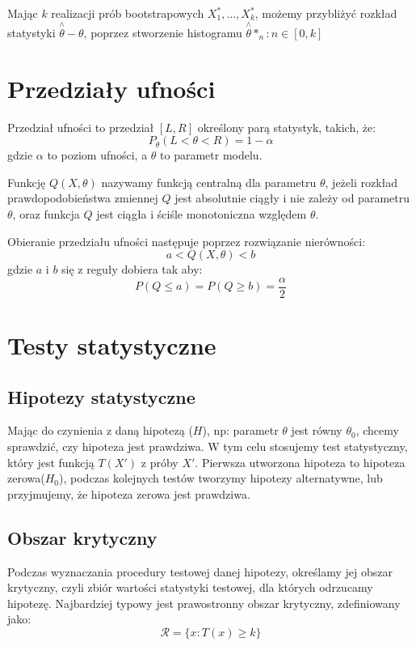 \documentclass{../notatki}
\begin{document}
Mając $k$ realizacji prób bootstrapowych $X_1^*, \dots, X_k^*$, możemy
przybliżyć rozkład statystyki $\stackrel{\wedge}{\theta} - \theta$, poprzez
stworzenie histogramu $\stackrel{\wedge}{\theta}*_n: n\in [0,k]$

\section{Przedziały ufności}

Przedział ufności to przedział $[L, R]$ określony parą statystyk, takich, że:
$$
P_\theta(L < \theta < R) = 1 - \alpha
$$
gdzie $\alpha$ to poziom ufności, a $\theta$ to parametr modelu.

Funkcję $Q(X, \theta)$ nazywamy funkcją centralną dla parametru $\theta$, jeżeli
rozkład prawdopodobieństwa zmiennej $Q$ jest absolutnie ciągły i nie zależy od
parametru $\theta$, oraz funkcja $Q$ jest ciągła i ściśle monotoniczna względem
$\theta$.

Obieranie przedziału ufności następuje poprzez rozwiązanie nierówności:
$$
a < Q(X, \theta) < b
$$
gdzie $a$ i $b$ się z reguły dobiera tak aby:
$$
P(Q \le a) = P(Q \ge b) = \frac{\alpha}{2}
$$

\section{Testy statystyczne}

\subsection{Hipotezy statystyczne}

Mając do czynienia z daną hipotezą ($H$), np: parametr $\theta$ jest równy
$\theta_0$, chcemy sprawdzić, czy hipoteza jest prawdziwa. W tym celu
stosujemy test statystyczny, który jest funkcją $T(X')$ z próby $X'$.
Pierwsza utworzona hipoteza to hipoteza zerowa($H_0$), podczas kolejnych
testów tworzymy hipotezy alternatywne, lub przyjmujemy, że hipoteza
zerowa jest prawdziwa.

\subsection{Obszar krytyczny}

Podczas wyznaczania procedury testowej danej hipotezy, określamy jej obszar
krytyczny, czyli zbiór wartości statystyki testowej, dla których
odrzucamy hipotezę. Najbardziej typowy jest prawostronny obszar krytyczny,
zdefiniowany jako:
$$
\mathcal{R} = \{x: T(x) \ge k\}
$$
\end{document}
